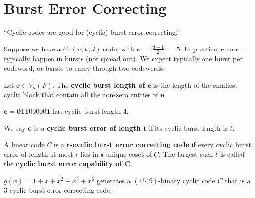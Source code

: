 \section{Burst Error Correcting}
``Cyclic codes are good for (cyclic) burst error correcting.''

Suppose we have a $ C:(n,k,d) $ code, with $ e=\lfloor \frac{d-1}{2} \rfloor=5 $.
In practice, errors typically happen in bursts (not spread out).
We expect typically one burst per codeword, or bursts to carry through
two codewords.

\begin{defbox}
    \begin{definition}
        Let $ \bm{e}\in V_n(F) $. The \textbf{cyclic burst length of $\bm{e}$}
        is the length of the smallest cyclic block that contain all the non-zero
        entries of $ \bm{e} $.
    \end{definition}
\end{defbox}

\begin{exbox}
    \begin{example}
        $ \bm{e}=\bm{011}00000\bm{1} $ has cyclic burst length $ 4 $.
    \end{example}
\end{exbox}

\begin{defbox}
    \begin{definition}
        We say $ \bm{e} $ is a \textbf{cyclic burst error of length $ \bm{t} $} if its cyclic
        burst length is $ t $.
    \end{definition}
\end{defbox}

\begin{defbox}
    \begin{definition}
        A linear code $ C $ is a \textbf{$ \bm{t} $-cyclic burst error correcting code}
        if every cyclic burst error of length at most $ t $ lies in a unique coset
        of $ C $. The largest such $ t $ is called the \textbf{cyclic burst error capability
            of $ \bm{C} $}.
    \end{definition}
\end{defbox}

\begin{exbox}
    \begin{example}
        $ g(x)=1+x+x^2+x^3+x^6 $ generates a $ (15,9) $-binary cyclic code $ C $
        that is a $ 3 $-cyclic burst error correcting code.
    \end{example}
\end{exbox}

